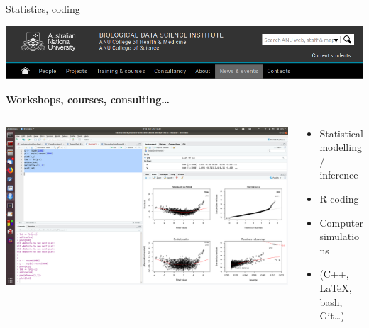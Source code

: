 \documentclass[10pt]{beamer}%
\begin{document}
\begin{frame}{Statistics, coding}
\begin{center}
\includegraphics[width=1\textwidth]{Figures/bdsi}

\textbf{Workshops, courses, consulting\dots}
\end{center}

\begin{columns}[c]
\begin{column}{0.5\textwidth}
\includegraphics[width=1\textwidth]{Figures/rstudio}
\end{column}
\begin{column}{0.5\textwidth}
    \begin{itemize}
        \item Statistical modelling / inference
        \item R-coding
        \item Computer simulations
        \item (C++, \LaTeX, bash, Git\dots)
    \end{itemize}
\end{column}
\end{columns}

\end{frame}
\end{document}
